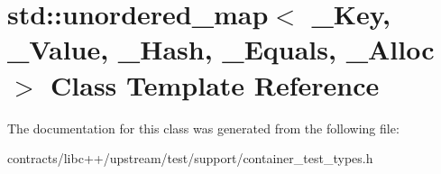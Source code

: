\hypertarget{classstd_1_1unordered__map}{}\section{std\+:\+:unordered\+\_\+map$<$ \+\_\+\+Key, \+\_\+\+Value, \+\_\+\+Hash, \+\_\+\+Equals, \+\_\+\+Alloc $>$ Class Template Reference}
\label{classstd_1_1unordered__map}


The documentation for this class was generated from the following file\+:\begin{DoxyCompactItemize}
\item 
contracts/libc++/upstream/test/support/container\+\_\+test\+\_\+types.\+h\end{DoxyCompactItemize}
